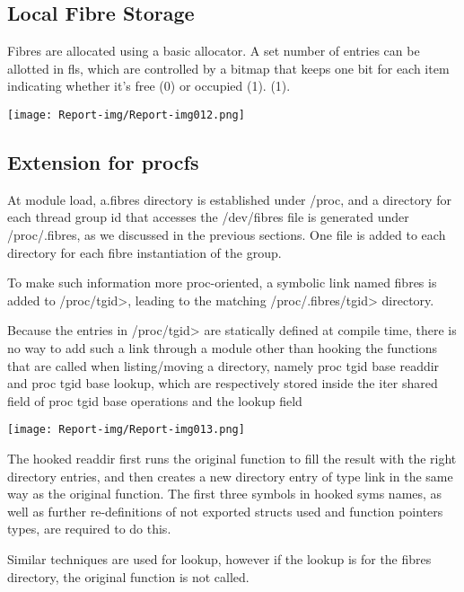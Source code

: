 \subsection{Local Fibre Storage}
Fibres are allocated using a basic allocator. A set number of entries can be allotted in fls, which are controlled by a bitmap that keeps one bit for each item indicating whether it's free (0) or occupied (1). (1).

 \texttt{[image: Report-img/Report-img012.png]} 

\subsection{Extension for procfs}
At module load, a.fibres directory is established under /proc, and a directory for each thread group id that accesses the /dev/fibres file is generated under /proc/.fibres, as we discussed in the previous sections. One file is added to each directory for each fibre instantiation of the group.

To make such information more proc-oriented, a symbolic link named fibres is added to /proc/tgid{\textgreater}, leading to the matching /proc/.fibres/tgid{\textgreater} directory.

Because the entries in /proc/tgid{\textgreater} are statically defined at compile time, there is no way to add such a link through a module other than hooking the functions that are called when listing/moving a directory, namely proc tgid base readdir and proc tgid base lookup, which are respectively stored inside the iter shared field of proc tgid base operations and the lookup field

 \texttt{[image: Report-img/Report-img013.png]} 

The hooked readdir first runs the original function to fill the result with the right directory entries, and then creates a new directory entry of type link in the same way as the original function. The first three symbols in hooked syms names, as well as further re-definitions of not exported structs used and function pointers types, are required to do this.

Similar techniques are used for lookup, however if the lookup is for the fibres directory, the original function is not called.


